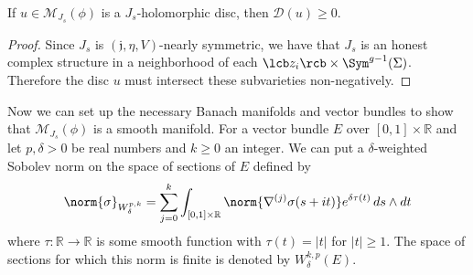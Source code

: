 \begin{lem}
If $u \in \mathcal M_{J_s}(\phi)$ is a $J_s$-holomorphic disc, then $\mathcal D(u) \geq 0$.
\end{lem}
\begin{proof}
Since $J_s$ is $(\mathfrak j,\eta,V)$-nearly symmetric, we have that $J_s$ is an honest complex structure in a neighborhood of each $\lcb z_i \rcb \times \Sym^{g-1}(\Sigma)$. Therefore the disc $u$ must intersect these subvarieties non-negatively.
\end{proof}

Now we can set up the necessary Banach manifolds and vector bundles to show that $\mathcal M_{J_s}(\phi)$ is a smooth manifold. For a vector bundle $E$ over $[0,1] \times \mathbb R$ and let $p,\delta > 0$ be real numbers and $k \geq 0$ an integer. We can put a $\delta$-weighted Sobolev norm on the space of sections of $E$ defined by
\[ \norm{\sigma}_{W^{p,k}_\delta} = \sum_{j=0}^k \int_{[0,1] \times \mathbb R} \norm{ \nabla^{(j)} \sigma(s+it) } e^{\delta \tau(t)} \, ds \wedge dt \]
where $\tau : \mathbb R \rightarrow \mathbb R$ is some smooth function with $\tau(t) = |t|$ for $|t| \geq 1$. The space of sections for which this norm is finite is denoted by $W^{k,p}_\delta(E)$.

